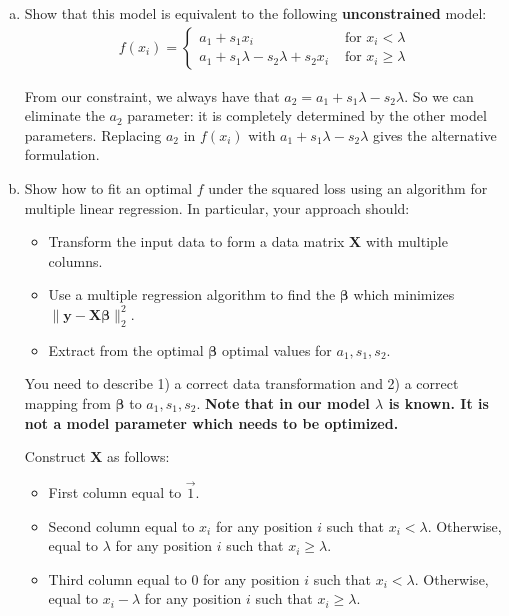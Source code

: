 \documentclass[10pt]{article}
\newcommand{\bs}[1]{\boldsymbol{#1}}
\newcommand{\bv}[1]{\mathbf{#1}}
\begin{document}
\begin{enumerate}[(a)]
	\item Show that this model is equivalent to the following \textbf{unconstrained} model:
	\begin{align*}
	f(x_i) = \begin{cases}
		a_1 + s_1x_i & \text{ for $x_i < \lambda$}\\ 
		a_1 + s_1 \lambda - s_2 \lambda + s_2x_i & \text{ for $x_i \geq \lambda$}
	\end{cases}
	\end{align*}
	
	\color{blue}
	From our constraint, we always have that $a_2 = a_1 + s_1\lambda  - s_2\lambda$. So we can eliminate the $a_2$ parameter: it is completely determined by the other model parameters. Replacing $a_2$ in $f(x_i)$ with $a_1 + s_1\lambda  - s_2\lambda$ gives the alternative formulation. 
	\color{black}
	
	\item Show how to fit an optimal $f$ under the squared loss using an algorithm for multiple linear regression. In particular, your approach should:
	\begin{itemize}
		\item Transform the input data to form a data matrix $\bv{X}$ with multiple columns.
		\item Use a multiple regression algorithm to find the $\bs{\beta}$ which minimizes $\|\bv{y} - \bv{X}\bs{\beta}\|_2^2.$
		\item Extract from the optimal $\bs{\beta}$ optimal values for $a_1, s_1, s_2$. 
	\end{itemize} 
	You need to describe 1) a correct data transformation and 2) a correct mapping from $\bs{\beta}$ to $a_1, s_1, s_2$. 
	\textbf{Note that in our model $\lambda$ is known. It is not a model parameter which needs to be optimized.}
	
	\color{blue}
	Construct $\bv{X}$ as follows:
	\begin{itemize}
		\item First column equal to $\vec{1}$. 
		\item Second column equal to $x_i$ for any position $i$ such that $x_i < \lambda$. Otherwise, equal to $\lambda$ for any position $i$ such that $x_i \geq \lambda$.
		\item Third column equal to $0$ for any position $i$ such that $x_i < \lambda$.  Otherwise, equal to $x_i - \lambda$ for any position $i$ such that $x_i \geq \lambda$.  
	\end{itemize}


\end{enumerate}
\end{document}
